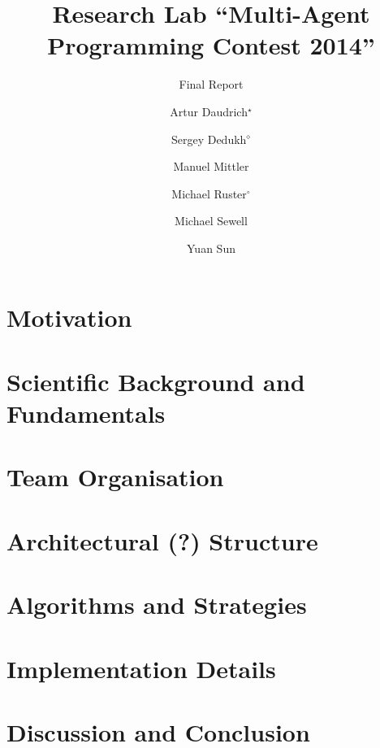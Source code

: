 \documentclass{../tech_reports/template/llncs}
\title{Research Lab \enquote{Multi-Agent Programming Contest 2014}}
\subtitle{Final Report}
\author{Artur Daudrich$^\star$ \and Sergey Dedukh$^\diamond$ \and Manuel Mittler \and Michael Ruster$^\circ$ \and Michael Sewell \and Yuan Sun}
\institute{University of Koblenz-Landau, Koblenz Campus}
\begin{document}
\maketitle

\tableofcontents

\section{Motivation}


\section{Scientific Background and Fundamentals}


\section{Team Organisation}


\section{Architectural (?) Structure}


\section{Algorithms and Strategies}


\section{Implementation Details}


\section{Discussion and Conclusion}


%
%
\printbibliography
\end{document}
